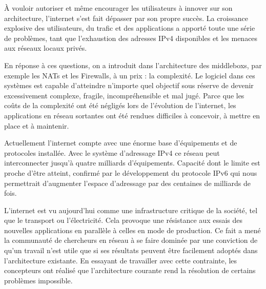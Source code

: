 À vouloir autoriser et même encourager les utilisateurs à innover sur son architecture, l'internet s'est fait dépasser par son propre succès. La croissance explosive des utilisateurs, du trafic et des applications a apporté toute une série de problèmes, 
tant que l'exhaustion des adresses IPv4 disponibles et les menaces aux réseaux locaux privés. 
\par
En réponse à ces questions, on a introduit dans l'architecture des \glspl{middlebox}, par exemple les NATs et les Firewalls, à un prix : la complexité. Le logiciel dans ces systèmes est capable d'atteindre n'importe quel objectif sous réserve de devenir excessivement complexe, fragile, incompréhensible et mal jugé. Parce que les coûts de la complexité ont été négligés lors de l'évolution de l'internet, les applications en réseau sortantes ont été rendues difficiles à concevoir, à mettre en place et à maintenir. \cite{InternetEvolutionRoleSoftwareEngineeringRealInternet}

Actuellement l'internet compte avec une énorme base d'équipements et de protocoles installée. Avec le système d'adressage IPv4 ce réseau peut interconnecter jusqu'à quatre milliards d'équipements. Capacité dont le limite est proche d'être atteint, confirmé par le développement du protocole IPv6 qui nous permettrait d'augmenter l'espace d'adressage par des centaines de milliards de fois. \cite{ICANNIPv6Important} 

L'internet est vu aujourd'hui comme une infrastructure critique de la société, tel que le transport ou l'électricité.  Cela provoque une résistance aux essais des nouvelles applications en parallèle à celles en mode de production. 
Ce fait a mené la communauté de chercheurs en réseau à se faire dominée par une conviction de qu'un travail n'est utile que si ses résultats peuvent être facilement adoptés dans l'architecture existante. En essayant de travailler avec cette contrainte, les concepteurs ont réalisé que l'architecture courante rend la résolution de certains problèmes impossible. \cite{OpenFlowStanfordOssification} \cite{SurveySDNIntro}





